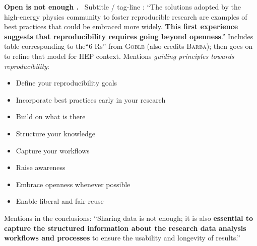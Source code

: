 \documentclass[sigconf,screen,nonacm]{acmart}
\newcommand{\mypara}[1]{\vspace{6pt}\noindent\textbf{#1}~}
\begin{document}
\mypara{Open is not enough \cite{chen2019open}.}  Subtitle / tag-line
: ``The solutions adopted by the high-energy physics community to
foster reproducible research are examples of best practices that could
be embraced more widely. \textbf{This first experience suggests that
  reproducibility requires going beyond openness}.'' Includes table
corresponding to the``6 Rs'' from \textsc{Goble}
\cite{carolegoble2016what} (also credits \textsc{Barba}); then goes on
to refine that model for HEP context. Mentions \emph{guiding
  principles towards reproducibility}:
\begin{itemize}
\item Define your reproducibility goals
\item Incorporate best practices early in your research
\item Build on what is there
\item Structure your knowledge
\item Capture your workflows
\item Raise awareness
\item Embrace openness whenever possible
\item Enable liberal and fair reuse
\end{itemize}
Mentions in the conclusions: ``Sharing data is not enough; it is also
\textbf{essential to capture the structured information about the
  research data analysis workflows and processes} to ensure the
usability and longevity of results.''


%

\end{document}
